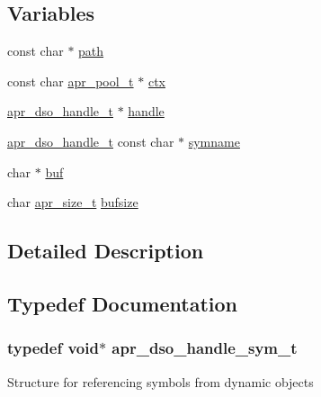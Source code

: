 \subsection*{Variables}
\begin{DoxyCompactItemize}
\item 
const char $\ast$ \hyperlink{group__apr__dso_ga3b02c6de5c049804444a246f7fdf46b4}{path}
\item 
const char \hyperlink{structapr__pool__t}{apr\+\_\+pool\+\_\+t} $\ast$ \hyperlink{group__apr__dso_ga3cb0653efd70b0c2ca423361b4ff5810}{ctx}
\item 
\hyperlink{structapr__dso__handle__t}{apr\+\_\+dso\+\_\+handle\+\_\+t} $\ast$ \hyperlink{group__apr__dso_ga7f148a82ac737c4782f73a9315c1c14b}{handle}
\item 
\hyperlink{structapr__dso__handle__t}{apr\+\_\+dso\+\_\+handle\+\_\+t} const char $\ast$ \hyperlink{group__apr__dso_ga59c85d310dcbd0e6a58a2a4a05863a18}{symname}
\item 
char $\ast$ \hyperlink{group__apr__dso_ga1fe855c208bc17a51a4d34fefdb2d5b1}{buf}
\item 
char \hyperlink{group__apr__platform_gaaa72b2253f6f3032cefea5712a27540e}{apr\+\_\+size\+\_\+t} \hyperlink{group__apr__dso_gaacff821b2b2a35a43f6b1db27538e122}{bufsize}
\end{DoxyCompactItemize}


\subsection{Detailed Description}


\subsection{Typedef Documentation}
\subsubsection[{\texorpdfstring{apr\+\_\+dso\+\_\+handle\+\_\+sym\+\_\+t}{apr_dso_handle_sym_t}}]{\setlength{\rightskip}{0pt plus 5cm}typedef {\bf void}$\ast$ {\bf apr\+\_\+dso\+\_\+handle\+\_\+sym\+\_\+t}}\hypertarget{group__apr__dso_gaf1aa0a039e8003586cfdfbc4ac57e775}{}\label{group__apr__dso_gaf1aa0a039e8003586cfdfbc4ac57e775}
Structure for referencing symbols from dynamic objects 

